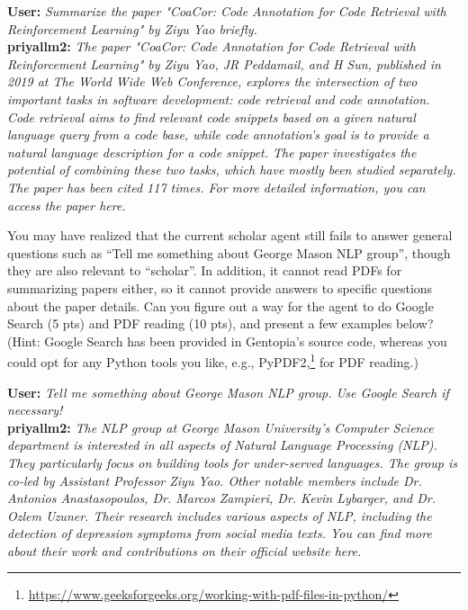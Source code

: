 \documentclass[11pt,addpoints,answers]{exam}
\begin{document}
\begin{questions}
    \begin{tcolorbox}[fit,height=4cm, width=16cm, blank, borderline={1pt}{-2pt},nobeforeafter]
    \textbf{User:} \textit{Summarize the paper "CoaCor: Code Annotation for Code Retrieval with Reinforcement Learning" by Ziyu Yao briefly.}
    \\
    \textbf{priyallm2:} \textit{The paper "CoaCor: Code Annotation for Code Retrieval with Reinforcement Learning" by Ziyu Yao, JR Peddamail, and H Sun, published in 2019 at The World Wide Web Conference, explores the intersection of two important tasks in software development: code retrieval and code annotation. Code retrieval aims to find relevant code snippets based on a given natural language query from a code base, while code annotation's goal is to provide a natural language description for a code snippet. The paper investigates the potential of combining these two tasks, which have mostly been studied separately. The paper has been cited 117 times. For more detailed information, you can access the paper here.}
    \end{tcolorbox} 

    \clearpage
    \question[15] You may have realized that the current scholar agent still fails to answer general questions such as ``Tell me something about George Mason NLP group'', though they are also relevant to ``scholar''. In addition, it cannot read PDFs for summarizing papers either, so it cannot provide answers to specific questions about the paper details. Can you figure out a way for the agent to do Google Search (5 pts) and PDF reading (10 pts), and present a few examples below? (Hint: Google Search has been provided in Gentopia's source code, whereas you could opt for any Python tools you like, e.g., PyPDF2,\footnote{\url{https://www.geeksforgeeks.org/working-with-pdf-files-in-python/}} for PDF reading.)

    \begin{tcolorbox}[fit,height=14cm, width=16cm, blank, borderline={1pt}{-2pt},nobeforeafter]
    \textbf{User:} \textit{Tell me something about George Mason NLP group. Use Google Search if necessary!}
    \\
    \textbf{priyallm2:} \textit{The NLP group at George Mason University's Computer Science department is interested in all aspects of Natural Language Processing (NLP). They particularly focus on building tools for under-served languages. The group is co-led by Assistant Professor Ziyu Yao. Other notable members include Dr. Antonios Anastasopoulos, Dr. Marcos Zampieri, Dr. Kevin Lybarger, and Dr. Ozlem Uzuner. Their research includes various aspects of NLP, including the detection of depression symptoms from social media texts. You can find more about their work and contributions on their official website here.}


\end{tcolorbox}
\end{questions}
\end{document}
